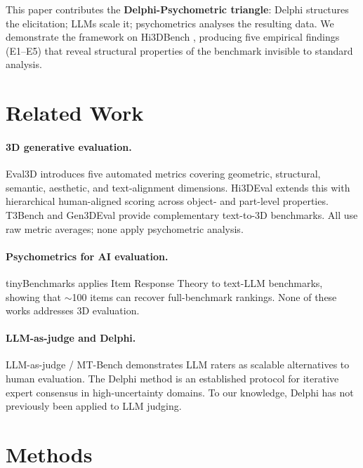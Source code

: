 \documentclass[10pt]{article}
\begin{document}
This paper contributes the \textbf{Delphi-Psychometric triangle}:
Delphi structures the elicitation; LLMs scale it; psychometrics analyses the
resulting data.
We demonstrate the framework on Hi3DBench \citep{hi3deval2025}, producing five
empirical findings (E1–E5) that reveal structural properties of the benchmark
invisible to standard analysis.

\section{Related Work}
\label{sec:related}

\paragraph{3D generative evaluation.}
Eval3D \citep{eval3d2025} introduces five automated metrics covering geometric,
structural, semantic, aesthetic, and text-alignment dimensions.
Hi3DEval \citep{hi3deval2025} extends this with hierarchical human-aligned
scoring across object- and part-level properties.
T3Bench \citep{t3bench2023} and Gen3DEval \citep{gen3deval2024} provide
complementary text-to-3D benchmarks.
All use raw metric averages; none apply psychometric analysis.

\paragraph{Psychometrics for AI evaluation.}
tinyBenchmarks \citep{tinybenchmarks2024} applies Item Response Theory to
text-LLM benchmarks, showing that $\sim$100 items can recover full-benchmark
rankings.
None of these works addresses 3D evaluation.

\paragraph{LLM-as-judge and Delphi.}
LLM-as-judge / MT-Bench \citep{llmjudge2023} demonstrates
LLM raters as scalable alternatives to human evaluation.
The Delphi method \citep{dalkey1963delphi,rowe1999delphi} is an established
protocol for iterative expert consensus in high-uncertainty domains.
To our knowledge, Delphi has not previously been applied to LLM judging.

\section{Methods}
\label{sec:methods}
\end{document}
